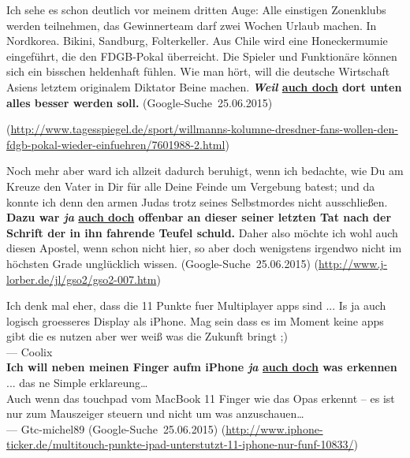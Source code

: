 \begin{exe}
	\ex\label{1191} 

	Ich sehe es schon deutlich vor meinem dritten Auge: Alle einstigen Zonenklubs werden teilnehmen, das Gewinnerteam darf zwei Wochen Urlaub machen. In 		Nordkorea. Bikini, Sandburg, Folterkeller. Aus Chile wird eine Honeckermumie eingeführt, die den FDGB-Pokal überreicht. Die Spieler und Funktionäre 		können sich ein bisschen heldenhaft fühlen. Wie man hört, will die deutsche Wirtschaft Asiens letztem originalem Diktator Beine machen. 					\textbf{\textit{Weil} \ul{auch doch} dort unten alles besser werden soll.} 						
	\newline\hbox{}\hfill\hbox{(Google-Suche 25.06.2015)}	
	\begin{sloppypar}
	{\scriptsize(\url{http://www.tagesspiegel.de/sport/willmanns-kolumne-dresdner-fans-wollen-den-fdgb-pokal-wieder-einfuehren/7601988-2.html})}\end{sloppypar}
\end{exe}								
						   
\begin{exe}
	\ex\label{1192} 

	Noch mehr aber ward ich allzeit dadurch beruhigt, wenn ich bedachte, wie Du am Kreuze den Vater in Dir für alle Deine Feinde um Vergebung batest; und 		da konnte ich denn den armen Judas trotz seines Selbstmordes nicht ausschließen. \textbf{Dazu war \textit{ja} \ul{auch doch} offenbar an dieser 		seiner letzten Tat nach der Schrift der in ihn fahrende Teufel schuld.} Daher also möchte ich wohl auch diesen Apostel, wenn schon nicht hier, so aber 		doch wenigstens irgendwo nicht im höchsten Grade unglücklich wissen.							
	\newline\hbox{}\hfill\hbox{(Google-Suche 25.06.2015)}	
	\newline
	{\scriptsize(\url{http://www.j-lorber.de/jl/gso2/gso2-007.htm})}
	\end{exe}						            
							           
\begin{exe}\largerpage[2]
	\ex\label{1193} 

	Ich denk mal eher, dass die 11 Punkte fuer Multiplayer apps sind ... Is ja auch logisch groesseres Display als iPhone. Mag sein dass es im Moment keine 		apps gibt die es nutzen aber wer weiß was die Zukunft bringt ;)\\
	— Coolix\medskip\\
\noindent \textbf{Ich will neben meinen Finger aufm iPhone \textit{ja} \ul{auch doch} was erkennen} ... das ne Simple erklareung… \\
	Auch wenn das touchpad vom MacBook 11 Finger wie das Opas erkennt – es ist nur zum Mauszeiger steuern und nicht um was anzuschauen…\\
	— Gtc-michel89 								
	\hfill\hbox{(Google-Suche 25.06.2015)}	
	\newline
	{\scriptsize(\url{http://www.iphone-ticker.de/multitouch-punkte-ipad-unterstutzt-11-iphone-nur-funf-10833/})}
\end{exe}								

